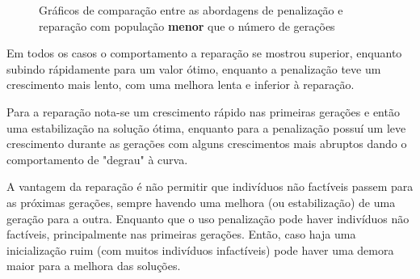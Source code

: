 \documentclass[11pt]{article}
\begin{document}
\begin{figure}[!h]
	\centering
	\quad %
	\caption{Gráficos de comparação entre as abordagens de penalização e reparação com população \textbf{menor} que o número de gerações}
	\label{fig:comparacao_populacao_menor_geracao}
\end{figure}



Em todos os casos o comportamento a reparação se mostrou superior, enquanto subindo rápidamente para um valor ótimo, enquanto a penalização teve um crescimento mais lento, com uma melhora lenta e inferior à reparação.

Para a reparação nota-se um crescimento rápido nas primeiras gerações e então uma estabilização na solução ótima, enquanto para a penalização possuí um leve crescimento durante as gerações com alguns crescimentos mais abruptos dando o comportamento de "degrau" à curva.

A vantagem da reparação é não permitir que indivíduos não factíveis passem para as próximas gerações, sempre havendo uma melhora (ou estabilização) de uma geração para a outra. Enquanto que o uso penalização pode haver indivíduos não factíveis, principalmente nas primeiras gerações. Então, caso haja uma inicialização ruim (com muitos indivíduos infactíveis) pode haver uma demora maior para a melhora das soluções.
\end{document}
